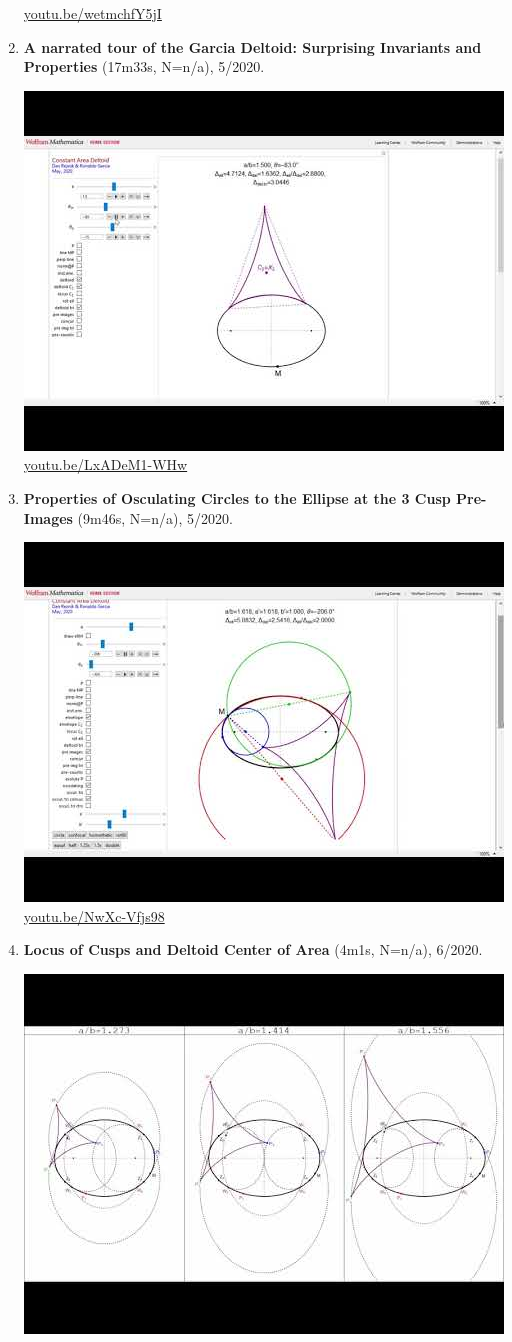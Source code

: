 \documentclass[12pt]{amsart}
\begin{document}
\begin{enumerate}[resume]
\begin{center}
\href{https://youtu.be/wetmchfY5jI}{\url{youtu.be/wetmchfY5jI}}\end{center}
% 
\item \textbf{A narrated tour of the Garcia Deltoid: Surprising Invariants and Properties} (17m33s, N=n/a), 5/2020. 
\begin{center}\includegraphics[width=.5\textwidth]{pics/LxADeM1-WHw.jpg} \\ 
\href{https://youtu.be/LxADeM1-WHw}{\url{youtu.be/LxADeM1-WHw}}\end{center}
% 
\item \textbf{Properties of Osculating Circles to the Ellipse at the 3 Cusp Pre-Images} (9m46s, N=n/a), 5/2020. 
\begin{center}\includegraphics[width=.5\textwidth]{pics/NwXc-Vfjs98.jpg} \\ 
\href{https://youtu.be/NwXc-Vfjs98}{\url{youtu.be/NwXc-Vfjs98}}\end{center}
% 
\item \textbf{Locus of Cusps and Deltoid Center of Area} (4m1s, N=n/a), 6/2020. 
\begin{center}\includegraphics[width=.5\textwidth]{pics/rZht21KFXk4.jpg} \\ 

\end{center}
\end{enumerate}
\end{document}
